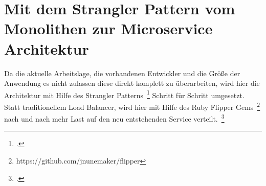 \section{Mit dem Strangler Pattern vom Monolithen zur Microservice Architektur}
Da die aktuelle Arbeitslage, die vorhandenen Entwickler und die Größe der Anwendung es nicht zulassen diese direkt komplett zu überarbeiten, wird hier die Architektur mit Hilfe des Strangler Patterns~\footcite[][]{Fowler:Strangler} Schritt für Schritt umgesetzt.
Statt traditionellem Load Balancer, wird hier mit Hilfe des Ruby Flipper Gems~\footnote{https://github.com/jnunemaker/flipper} nach und nach mehr Last auf den neu entstehenden Service verteilt.~\footcite[vgl.][]{Hammant:Strangler}